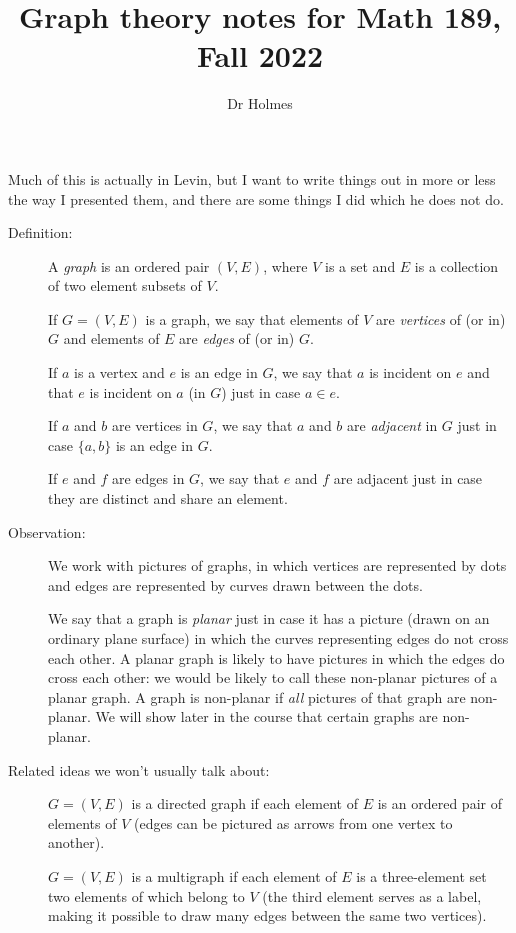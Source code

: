\documentclass[12pt]{article}
\title{Graph theory notes for Math 189, Fall 2022}
\author{Dr Holmes}
\begin{document}
\maketitle

Much of this is actually in Levin, but I want to write things out in more or less the way I presented them, and there are some things I did which he does not do.

\begin{description}

\item[Definition:]   A {\em graph\/} is an ordered pair $(V,E)$, where $V$ is a set and $E$ is a collection of two element subsets of $V$.

If $G=(V,E)$ is a graph, we say that elements of $V$ are {\em vertices\/} of (or in) $G$ and elements of $E$ are {\em edges\/} of (or in) $G$.

If $a$ is a vertex and $e$ is an edge in $G$, we say that $a$ is incident on $e$ and that $e$ is incident on $a$ (in $G$) just in case $a \in e$.

If $a$ and $b$ are vertices in $G$, we say that $a$ and $b$ are {\em adjacent\/} in $G$ just in case $\{a,b\}$ is an edge in $G$.

If $e$ and $f$ are edges in $G$, we say that $e$ and $f$ are adjacent just in case they are distinct and share an element.

\item[Observation:]  We work with pictures of graphs, in which vertices are represented by dots and edges are represented by curves drawn between the dots.

We say that a graph is {\em planar\/} just in case it has a picture (drawn on an ordinary plane surface) in which the curves representing edges do not cross each other.  A planar graph is likely to have pictures in which the edges do cross each other:  we would be likely to call these non-planar pictures of a planar graph.  A graph is non-planar if {\em all\/} pictures of that graph are non-planar.  We will show later in the course that certain graphs are non-planar.

\item[Related ideas we won't usually talk about:]  $G=(V,E)$ is a directed graph if each element of $E$ is an ordered pair of elements of $V$ (edges can be pictured as arrows from one vertex to another).

$G=(V,E)$ is a multigraph if each element of $E$ is a three-element set two elements of which belong to $V$ (the third element serves as a label, making it possible to draw many edges between the same two vertices).


\end{description}
\end{document}

